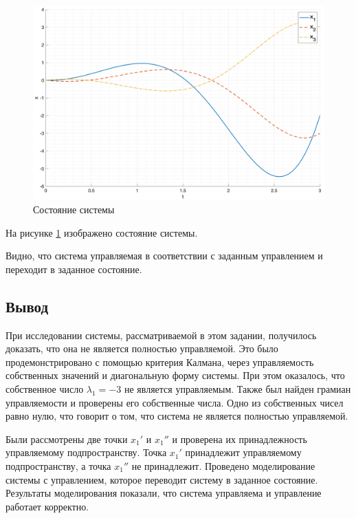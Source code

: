 \begin{figure}
    \centering
    \includegraphics[width=\textwidth]{media/plots/task2_states.png}
    \caption{Состояние системы}
    \label{fig:task2_state}
\end{figure}
На рисунке \ref{fig:task2_state} изображено состояние системы.

Видно, что система управляемая в соответствии с заданным управлением и переходит в заданное состояние. 

\FloatBarrier
\subsection{Вывод}
При исследовании системы, рассматриваемой в этом задании, получилось доказать, что она 
не является полностью управляемой. Это было продемонстрировано с помощью критерия Калмана,
через управляемость собственных значений и диагональную форму системы. При этом оказалось, 
что собственное число $\lambda_1 = -3$ не является управляемым. Также был найден грамиан
управляемости и проверены его собственные числа. Одно из собственных чисел равно нулю, что
говорит о том, что система не является полностью управляемой. 

Были рассмотрены две точки $x_1'$ и $x_1''$ и проверена их принадлежность управляемому
подпространству. Точка $x_1'$ принадлежит управляемому подпространству, а точка $x_1''$ не принадлежит. 
Проведено моделирование системы с управлением, которое переводит систему в заданное состояние.
Результаты моделирования показали, что система управляема и управление работает корректно.